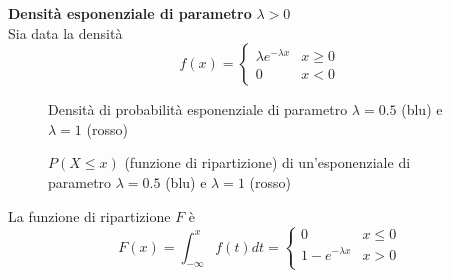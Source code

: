 \begin{exmp}
    \textbf{Densità esponenziale di parametro} $ \lambda > 0 $ \\
    Sia data la densità
    \begin{equation*}
        f(x) = \begin{cases}
            \lambda e^{-\lambda x} & x \geq 0 \\
            0 & x < 0
        \end{cases}
    \end{equation*}

    \begin{figure}[htbp]
        \centering

        \caption{Densità di probabilità esponenziale di parametro $\lambda = 0.5$ (blu) e $\lambda = 1$ (rosso)}
        \label{exparam}
    \end{figure}

    \begin{figure}[htbp]
        \centering

        \caption{$P(X \leq x)$ (funzione di ripartizione) di un'esponenziale di parametro $\lambda = 0.5$ (blu) e $\lambda = 1$ (rosso)}
        \label{exparam2}
    \end{figure}

    La funzione di ripartizione $ F $ è
    \begin{equation}
        F(x) = \int_{-\infty}^{x} f(t) dt = \begin{cases}
            0 & x \leq 0 \\
            1 - e^{-\lambda x} & x > 0 \\
        \end{cases}
    \end{equation}

\end{exmp}


